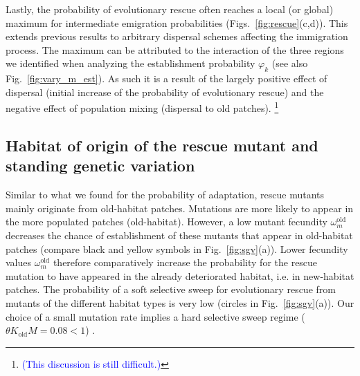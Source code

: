 \documentclass[11pt]{article}
\newcommand{\francois}[1]{\textcolor{blue}{(#1)}}
\newcommand{\chg}[1]{\textcolor{change}{#1}}
\begin{document}
Lastly, the probability of evolutionary rescue often reaches a local (or global) maximum for intermediate emigration probabilities (Figs.~\ref{fig:rescue}(c,d)). This extends previous results \citep{uecker_2014,tomasini_2019} to arbitrary dispersal schemes affecting the immigration process. The maximum can be attributed to the interaction of the three regions we identified when analyzing the establishment probability $\varphi_k$ (see also Fig.~\ref{fig:vary_m_est}). As such it is a result of the largely positive effect of dispersal (initial increase of the probability of evolutionary rescue) and the negative effect of population mixing \chg{(dispersal to old patches)}. \footnote{\francois{This discussion is still difficult.}}

\subsection*{Habitat of origin of the rescue mutant and standing genetic variation}
Similar to what \chg{we} found for the probability of adaptation, rescue mutants mainly originate from old-habitat patches. Mutations are more likely to appear in the more populated patches (old-habitat). However, a low mutant fecundity $\omega^\text{old}_m$ decreases the chance of establishment of these mutants that appear in old-habitat patches (compare black and yellow symbols in Fig.~\ref{fig:sgv}(a)). Lower fecundity values $\omega^\text{old}_m$ therefore comparatively increase the probability for the rescue mutation to have appeared in the already deteriorated habitat, i.e. in new-habitat patches. \chg{The probability of a soft selective sweep for evolutionary rescue from mutants of the different habitat types is very low (circles in Fig.~\ref{fig:sgv}(a)). Our choice of a small mutation rate implies a hard selective sweep regime ($\theta K_{\text{old}} M = 0.08<1$) \citep{wilson_2018,hermisson_2017}. }
\end{document}

